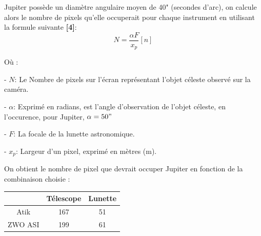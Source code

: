 \documentclass{aa}
\begin{document}



%

Jupiter possède un diamètre angulaire moyen de 40" (secondes d'arc), on calcule alors le nombre de pixels qu'elle occuperait pour chaque instrument en utilisant la formule suivante \textbf{[4]}: 
\begin{equation}
    N = \frac{\alpha F}{x_p} \left[n\right]
\end{equation}

Où :\begin{flushleft}
    \item - $N$: Le Nombre de pixels sur l'écran représentant l'objet céleste observé sur la caméra.
    \item - $\alpha$: Exprimé en radians, est l'angle d'observation de l'objet céleste, en l'occurence, pour Jupiter, $\alpha = 50"$
    \item - $F$: La focale de la lunette astronomique.
    \item - $x_p$: Largeur d'un pixel, exprimé en mètres (m).
    
\end{flushleft}

On obtient le nombre de pixel que devrait occuper Jupiter en fonction de la combinaison choisie :
\begin{flushleft}
\centering
        \begin{tabular}{|c|c|c|}
        \hline
           & Télescope & Lunette  \\
        \hline
           Atik  & 167 & 51\\
        \hline
            ZWO ASI & 199 & 61\\
        \hline
        \end{tabular}
\end{flushleft}
\end{document}
